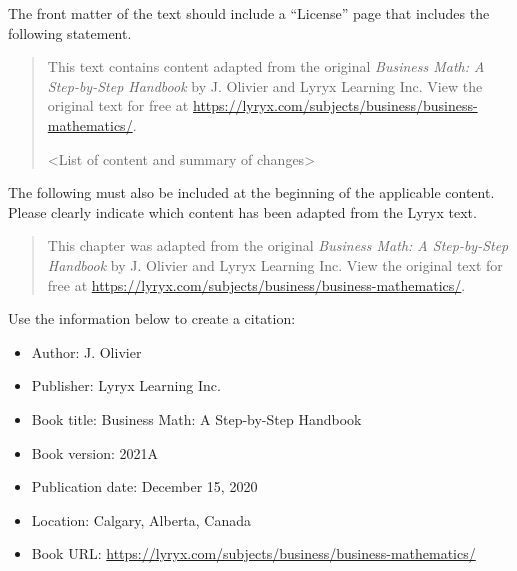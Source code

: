 {The front matter of the text should include a ``License'' page that includes the following statement.

\begin{quotation}\vspace*{-1em}
\noindent This text contains content adapted from the original \textit{Business Math: A Step-by-Step Handbook} by J. Olivier and Lyryx Learning Inc. View the original text for free at \url{https://lyryx.com/subjects/business/business-mathematics/}.

<List of content and summary of changes>
\end{quotation}\vspace*{-1em}

\hangindent=15pt The following must also be included at the beginning of the applicable content. Please clearly indicate which content has been adapted from the Lyryx text.

\begin{quotation}\vspace*{-1em}
\noindent This chapter was adapted from the original \textit{Business Math: A Step-by-Step Handbook} by J. Olivier and Lyryx Learning Inc. View the original text for free at \url{https://lyryx.com/subjects/business/business-mathematics/}.
\end{quotation}\vspace*{-1em}

}

\noindent {\fontsize{12pt}{20pt}\subheaderfont\textcolor{secondarycolour}{Citation}}
\vspace*{-0.5em}

{\footnotesize
\noindent Use the information below to create a citation:

\vspace*{-2em}
\begin{itemize}
\item[] Author: J. Olivier
\item[] Publisher: Lyryx Learning Inc.
\item[] Book title: Business Math: A Step-by-Step Handbook
\item[] Book version: 2021A
\item[] Publication date: December 15, 2020
\item[] Location: Calgary, Alberta, Canada
\item[] Book URL: \url{https://lyryx.com/subjects/business/business-mathematics/}
\end{itemize}
}

{\footnotesize
\noindent {\subheaderfont\textcolor{secondarycolour}{For questions or comments please contact }\textcolor{primarycolour}{editorial@lyryx.com}}}

\setlength{\parskip}{\baselineskip}
